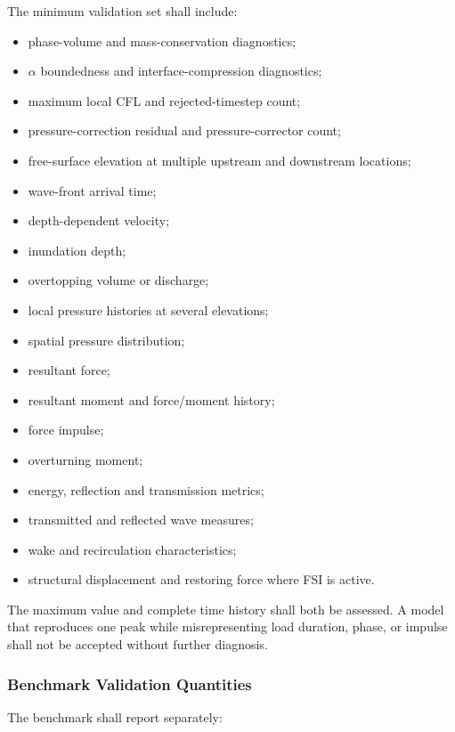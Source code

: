 The minimum validation set shall include:

\begin{itemize}
  \item phase-volume and mass-conservation diagnostics;
  \item $\alpha$ boundedness and interface-compression diagnostics;
  \item maximum local CFL and rejected-timestep count;
  \item pressure-correction residual and pressure-corrector count;
  \item free-surface elevation at multiple upstream and downstream
    locations;
  \item wave-front arrival time;
  \item depth-dependent velocity;
  \item inundation depth;
  \item overtopping volume or discharge;
  \item local pressure histories at several elevations;
  \item spatial pressure distribution;
  \item resultant force;
  \item resultant moment and force/moment history;
  \item force impulse;
  \item overturning moment;
  \item energy, reflection and transmission metrics;
  \item transmitted and reflected wave measures;
  \item wake and recirculation characteristics;
  \item structural displacement and restoring force where FSI is
    active.
\end{itemize}

The maximum value and complete time history shall both be assessed.
A model that reproduces one peak while misrepresenting load duration,
phase, or impulse shall not be accepted without further diagnosis.

\subsubsection{Benchmark Validation Quantities}
\label{sec:res-ver-met-benchmark-validation-quantities}

The benchmark shall report separately:


